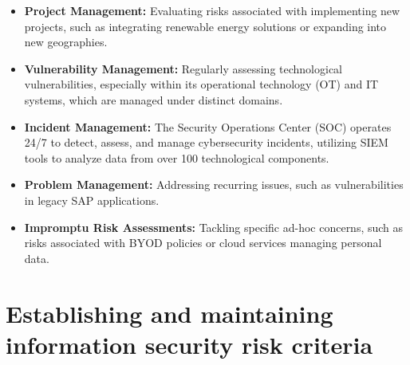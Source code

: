 \begin{itemize}
    \item \textbf{Project Management:} Evaluating risks associated with implementing new projects, such as integrating renewable energy solutions or expanding into new geographies.

    \item \textbf{Vulnerability Management:} Regularly assessing technological vulnerabilities, especially within its operational technology (OT) and IT systems, which are managed under distinct domains.

    \item \textbf{Incident Management:} The Security Operations Center (SOC) operates 24/7 to detect, assess, and manage cybersecurity incidents, utilizing SIEM tools to analyze data from over 100 technological components.

    \item \textbf{Problem Management:} Addressing recurring issues, such as vulnerabilities in legacy SAP applications.

    \item \textbf{Impromptu Risk Assessments:} Tackling specific ad-hoc concerns, such as risks associated with BYOD policies or cloud services managing personal data.
\end{itemize}


\section{Establishing and maintaining information security risk criteria}

